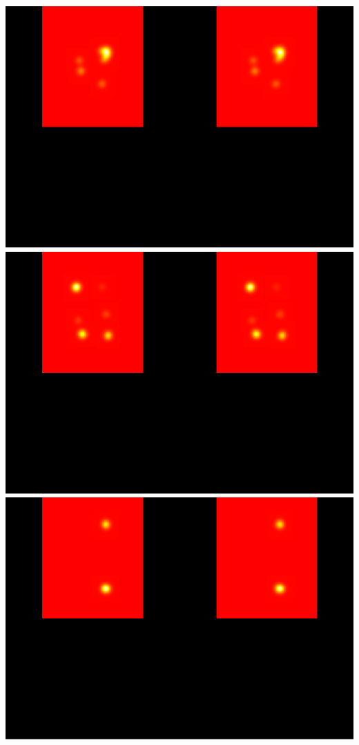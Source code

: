 \documentclass[]{article}
\begin{document}
\includegraphics{tapas-vignette_files/figure-latex/unnamed-chunk-11-1.pdf}
\includegraphics{tapas-vignette_files/figure-latex/unnamed-chunk-11-2.pdf}
\includegraphics{tapas-vignette_files/figure-latex/unnamed-chunk-11-3.pdf}
\end{document}
